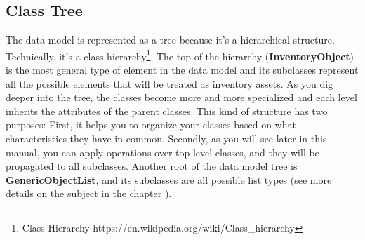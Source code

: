\documentclass[a4paper]{article}
\begin{document}
		\subsection{Class Tree}
			The data model is represented as a tree because it's a hierarchical structure. Technically, it's a class hierarchy\footnote{Class Hierarchy https://en.wikipedia.org/wiki/Class\_hierarchy}. The top of the hierarchy (\textbf{InventoryObject}) is the most general type of element in the data model and its subclasses represent all the possible elements that will be treated as inventory assets. As you dig deeper into the tree, the classes become more and more specialized and each level inherits the attributes of the parent classes. This kind of structure has two purposes: First, it helps you to organize your classes based on what characteristics they have in common. Secondly, as you will see later in this manual, you can apply operations over top level classes, and they will be propagated to all subclasses. Another root of the data model tree is \textbf{GenericObjectList}, and its subclasses are all possible list types (see more details on the subject in the chapter \textbf{}).\newline
			
\end{document}
